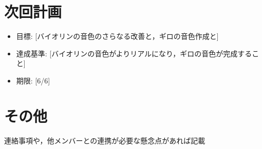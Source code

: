 \documentclass[uplatex,dvipdfmx]{jlreq}
\begin{document}
\section{次回計画}
\begin{itemize}
    \item  目標: [バイオリンの音色のさらなる改善と，ギロの音色作成と]
    \item  達成基準: [バイオリンの音色がよりリアルになり，ギロの音色が完成すること]
    \item  期限: [6/6]
\end{itemize}

\section{その他}
連絡事項や，他メンバーとの連携が必要な懸念点があれば記載
\end{document}
